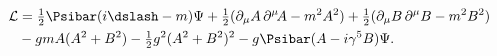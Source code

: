\begin{equation}
\label{eq:lagrangian}
\begin{split}
  \mathcal{L}&=\tfrac{1}{2}\Psibar (i \dslash-m) \Psi
  +\tfrac{1}{2}(\partial_\mu A\, \partial^\mu\! A-m^2 A^2)
  +\tfrac{1}{2}(\partial_\mu B\, \partial^\mu B-m^2 B^2)\\
  &-gmA(A^2+B^2)-\tfrac{1}{2}g^2(A^2+B^2)^2 
  -g\Psibar(A-i\gamma^5 B)\Psi.
\end{split}
\end{equation}

